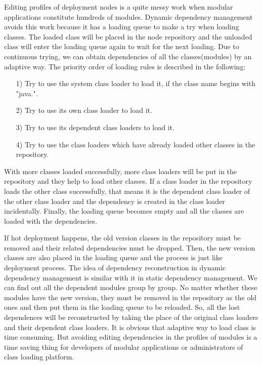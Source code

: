\documentclass[conference]{IEEEtran}
\begin{document}
Editing profiles of deployment nodes is a quite messy work when modular applications constitute hundreds of modules.
Dynamic dependency management avoids this work because it has a loading queue to make a try when loading classes.
The loaded class will be placed in the node repository and the unloaded class will enter the loading queue again to wait for the next loading.
Due to continuous trying, we can obtain dependencies of all the classes(modules) by an adaptive way.
The priority order of loading rules is described in the following:
\begin{itemize}[]
\item[1)] Try to use the system class loader to load it, if the class name begins with "java.".
\item[2)] Try to use its own class loader to load it.
\item[3)] Try to use its dependent class loaders to load it.
\item[4)] Try to use the class loaders which have already loaded other classes in the repository. 
\end{itemize}

With more classes loaded successfully, more class loaders will be put in the repository and they help to load other classes.
If a class loader in the repository loads the other class successfully, that means it is the dependent class loader of the other class loader and the dependency is created in the class loader incidentally.
Finally, the loading queue becomes empty and all the classes are loaded with the dependencies.

If hot deployment happens, the old version classes in the repository must be removed and their related dependencies must be dropped.
Then, the new version classes are also placed in the loading queue and the process is just like deployment process.
The idea of dependency reconstruction in dynamic dependency management is similar with it in static dependency management.
We can find out all the dependent modules group by group.
No matter whether these modules have the new version, they must be removed in the repository as the old ones and then put them in the loading queue to be reloaded.
So, all the lost dependences will be reconstructed by taking the place of the original class loaders and their dependent class loaders.
It is obvious that adaptive way to load class is time consuming.
But avoiding editing dependencies in the profiles of modules is a time saving thing for developers of modular applications or administrators of class loading platform. 
\end{document}
